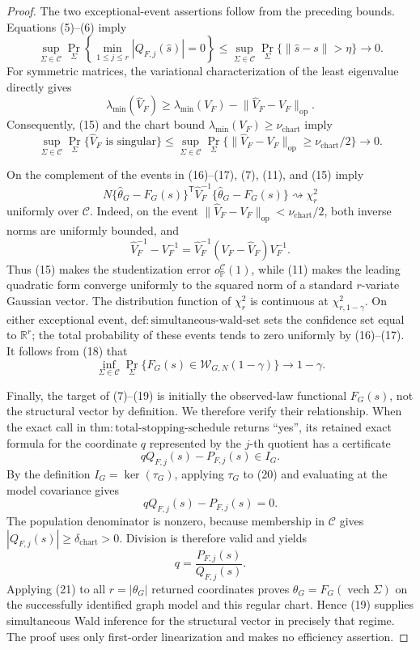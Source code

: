 \documentclass{article}
\begin{document}
\begin{proof}
The two exceptional-event assertions follow from the preceding bounds.  Equations (5)--(6) imply
\[
 \sup_{\Sigma\in\mathcal C}
 \Pr_{\Sigma}\!\left\{\min_{1\le j\le r}|Q_{F,j}(\widehat s)|=0\right\}
 \le
 \sup_{\Sigma\in\mathcal C}\Pr_{\Sigma}\{\lVert\widehat s-s\rVert>\eta\}
 \longrightarrow0.
\tag{16}
\]
For symmetric matrices, the variational characterization of the least eigenvalue directly gives
\[
 \lambda_{\min}(\widehat V_F)
 \ge\lambda_{\min}(V_F)-\lVert\widehat V_F-V_F\rVert_{\mathrm{op}}.
\]
Consequently, (15) and the chart bound \(\lambda_{\min}(V_F)\ge\nu_{\mathrm{chart}}\) imply
\[
 \sup_{\Sigma\in\mathcal C}\Pr_{\Sigma}\{\widehat V_F\text{ is singular}\}
 \le
 \sup_{\Sigma\in\mathcal C}
 \Pr_{\Sigma}\{\lVert\widehat V_F-V_F\rVert_{\mathrm{op}}\ge\nu_{\mathrm{chart}}/2\}
 \longrightarrow0.
\tag{17}
\]

On the complement of the events in (16)--(17), (7), (11), and (15) imply
\[
 N\{\widehat\theta_G-F_G(s)\}^{\mathsf T}\widehat V_F^{-1}
 \{\widehat\theta_G-F_G(s)\}
 \rightsquigarrow\chi_r^2
\tag{18}
\]
uniformly over \(\mathcal C\).  Indeed, on the event
\(\lVert\widehat V_F-V_F\rVert_{\mathrm{op}}<\nu_{\mathrm{chart}}/2\), both inverse norms are uniformly bounded, and
\[
 \widehat V_F^{-1}-V_F^{-1}
 =\widehat V_F^{-1}(V_F-\widehat V_F)V_F^{-1}.
\]
Thus (15) makes the studentization error \(o_{\mathbb P}^{\mathcal C}(1)\), while (11) makes the leading quadratic form converge uniformly to the squared norm of a standard \(r\)-variate Gaussian vector.  The distribution function of \(\chi_r^2\) is continuous at \(\chi^2_{r,1-\gamma}\).  On either exceptional event, \(\mathrm{def:simultaneous\mbox{-}wald\mbox{-}set}\) sets the confidence set equal to \(\mathbb R^r\); the total probability of these events tends to zero uniformly by (16)--(17).  It follows from (18) that
\[
 \inf_{\Sigma\in\mathcal C}
 \Pr_{\Sigma}\{F_G(s)\in\mathcal W_{G,N}(1-\gamma)\}
 \longrightarrow1-\gamma.
\tag{19}
\]

Finally, the target of (7)--(19) is initially the observed-law functional \(F_G(s)\), not the structural vector by definition.  We therefore verify their relationship.  When the exact call in \(\mathrm{thm:total\mbox{-}stopping\mbox{-}schedule}\) returns ``yes'', its retained exact formula for the coordinate \(q\) represented by the \(j\)-th quotient has a certificate
\[
 qQ_{F,j}(s)-P_{F,j}(s)\in I_G.
\tag{20}
\]
By the definition \(I_G=\ker(\tau_G)\), applying \(\tau_G\) to (20) and evaluating at the model covariance gives
\[
 qQ_{F,j}(s)-P_{F,j}(s)=0.
\]
The population denominator is nonzero, because membership in \(\mathcal C\) gives
\(|Q_{F,j}(s)|\ge\delta_{\mathrm{chart}}>0\).  Division is therefore valid and yields
\[
 q=\frac{P_{F,j}(s)}{Q_{F,j}(s)}.
\tag{21}
\]
Applying (21) to all \(r=|\theta_G|\) returned coordinates proves
\(\theta_G=F_G(\operatorname{vech}\Sigma)\) on the successfully identified graph model and this regular chart.  Hence (19) supplies simultaneous Wald inference for the structural vector in precisely that regime.  The proof uses only first-order linearization and makes no efficiency assertion.
\end{proof}
\end{document}
